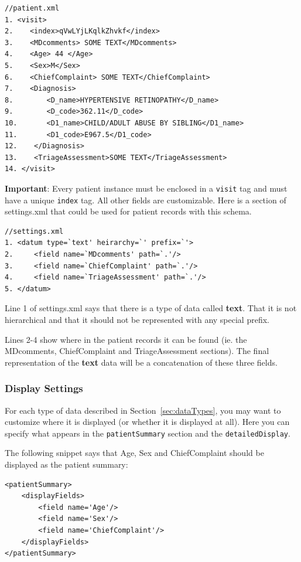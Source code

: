 \documentclass[12pt]{article}
\begin{document}
\begin{verbatim}
//patient.xml
1. <visit>
2.    <index>qVwLYjLKqlkZhvkf</index>
3.    <MDcomments> SOME TEXT</MDcomments>
4.    <Age> 44 </Age>
5.    <Sex>M</Sex>
6.    <ChiefComplaint> SOME TEXT</ChiefComplaint>
7.    <Diagnosis>
8.        <D_name>HYPERTENSIVE RETINOPATHY</D_name>
9.        <D_code>362.11</D_code>
10.       <D1_name>CHILD/ADULT ABUSE BY SIBLING</D1_name>
11.       <D1_code>E967.5</D1_code>
12.    </Diagnosis>
13.    <TriageAssessment>SOME TEXT</TriageAssessment>
14. </visit>
\end{verbatim}
{\bf Important}: Every patient instance must be enclosed in a {\tt visit} tag and must have a unique {\tt index} tag. All other fields are customizable.
Here is a section of settings.xml that could be used for patient records with this schema.

\begin{verbatim}
//settings.xml
1. <datum type=`text' heirarchy=`' prefix=`'>
2.     <field name=`MDcomments' path=`.'/>
3.     <field name=`ChiefComplaint' path=`.'/>
4.     <field name=`TriageAssessment' path=`.'/>
5. </datum>
\end{verbatim}

Line 1 of settings.xml says that there is a type of data called {\bf text}. That it is not hierarchical and that it should not be represented with any special prefix.

Lines 2-4 show where in the patient records it can be found (ie. the MDcomments, ChiefComplaint and TriageAssessment sections). The final representation of the {\bf text} data will be a concatenation of these three fields.

\subsubsection{Display Settings}
\label{sec:display_settings}
For each type of data described in Section~\ref{sec:dataTypes}, you may want to customize where it is displayed (or whether it is displayed at all). Here you can specify what appears in the {\tt patientSummary} section and the {\tt detailedDisplay}. 

The following snippet says that Age, Sex and ChiefComplaint should be displayed as the patient summary:
\begin{verbatim}
<patientSummary>
    <displayFields>
        <field name='Age'/>
        <field name='Sex'/>
        <field name='ChiefComplaint'/>
    </displayFields>
</patientSummary>
\end{verbatim}
\end{document}
